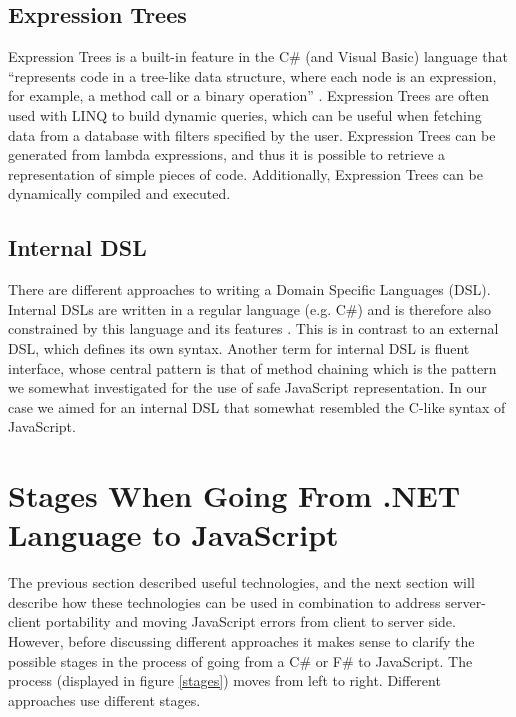 
	\subsection{Expression Trees} %
	\label{ssub:expression_trees}
			Expression Trees is a built-in feature in the C\# (and Visual Basic) language that ``represents code in a tree-like data structure, where each node is an expression, for example, a method call or a binary operation'' \cite{expression_trees}. Expression Trees are often used with LINQ to build dynamic queries, which can be useful when fetching data from a database with filters specified by the user. Expression Trees can be generated from lambda expressions, and thus it is possible to retrieve a representation of simple pieces of code. Additionally, Expression Trees can be dynamically compiled and executed.

	\subsection{Internal DSL} %
	\label{ssub:internal_dsl}
		There are different approaches to writing a Domain Specific Languages (DSL). Internal DSLs are written in a regular language (e.g. C\#) and is therefore also constrained by this language and its features \cite{domain_specific_languages}. This is in contrast to an external DSL, which defines its own syntax. Another term for internal DSL is fluent interface, whose central pattern is that of method chaining which is the pattern we somewhat investigated for the use of safe JavaScript representation. In our case we aimed for an internal DSL that somewhat resembled the C-like syntax of JavaScript.

\section{Stages When Going From .NET Language to JavaScript} %
\label{sec:stages_when_going_from_net_language_to_javascript}
	The previous section described useful technologies, and the next section will describe how these technologies can be used in combination to address server-client portability and moving JavaScript errors from client to server side. However, before discussing different approaches it makes sense to clarify the possible stages in the process of going from a C\# or F\# to JavaScript. The process (displayed in figure \ref{stages}) moves from left to right. Different approaches use different stages.

